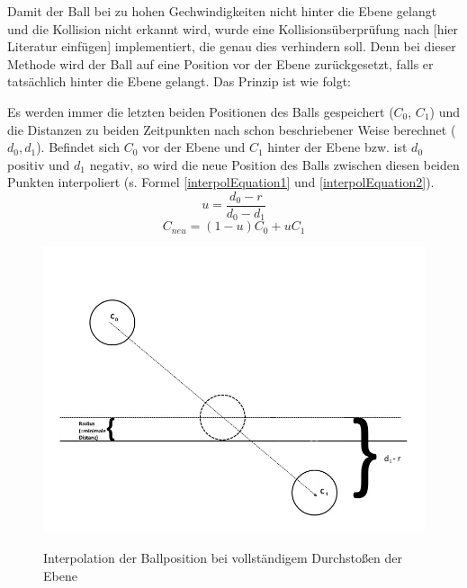 Damit der Ball bei zu hohen Gechwindigkeiten nicht hinter die Ebene gelangt und die Kollision nicht erkannt wird, wurde eine Kollisionsüberprüfung nach [hier Literatur einfügen] implementiert, die genau dies verhindern soll. Denn bei dieser Methode wird der Ball auf eine Position vor der Ebene zurückgesetzt, falls er tatsächlich hinter die Ebene gelangt. Das Prinzip ist wie folgt:

Es werden immer die letzten beiden Positionen des Balls gespeichert ($C_0$, $C_1$) und die Distanzen zu beiden Zeitpunkten nach schon beschriebener Weise berechnet ($d_0, d_1$).
Befindet sich $C_0$ vor der Ebene und $C_1$ hinter der Ebene bzw. ist $d_0$ positiv und $d_1$ negativ, so wird die neue Position des Balls zwischen diesen beiden Punkten interpoliert (s. Formel \ref{interpolEquation1} und \ref{interpolEquation2}). 
\begin{equation}	
\label{interpolEquation1}
	u = \frac{d_0 - r}{d_0 - d_1}
\end{equation}
\begin{equation}	
\label{interpolEquation2}
	C_{neu} = (1-u)C_0 + uC_1
\end{equation}

\begin{figure}[h]
   \begin{center}
       \includegraphics[scale=0.5]{bilder/interpolation}\label{fig_interpolation}
   \end{center}
    
    \caption[Testbilder]{Interpolation der Ballposition bei vollständigem Durchstoßen der Ebene}
        \label{fig_interpol}
\end{figure} 

